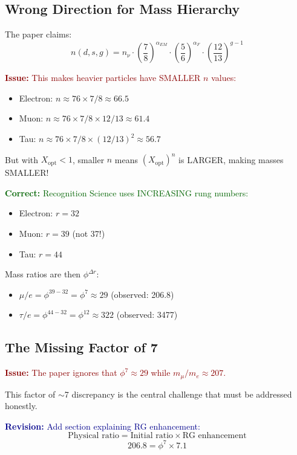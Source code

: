 \documentclass[12pt,a4paper]{article}
\newcommand{\issue}[1]{\textcolor{darkred}{\textbf{Issue: }#1}}
\newcommand{\correct}[1]{\textcolor{darkgreen}{\textbf{Correct: }#1}}
\newcommand{\revision}[1]{\textcolor{darkblue}{\textbf{Revision: }#1}}
\begin{document}
\subsection{Wrong Direction for Mass Hierarchy}

The paper claims:
\begin{equation}
n(d,s,g) = n_\nu \cdot \left(\frac{7}{8}\right)^{\alpha_{EM}} \cdot \left(\frac{5}{6}\right)^{\alpha_F} \cdot \left(\frac{12}{13}\right)^{g-1}
\end{equation}

\issue{This makes heavier particles have SMALLER $n$ values:}
\begin{itemize}
\item Electron: $n \approx 76 \times 7/8 \approx 66.5$
\item Muon: $n \approx 76 \times 7/8 \times 12/13 \approx 61.4$  
\item Tau: $n \approx 76 \times 7/8 \times (12/13)^2 \approx 56.7$
\end{itemize}

But with $X_{\text{opt}} < 1$, smaller $n$ means $(X_{\text{opt}})^n$ is LARGER, making masses SMALLER!

\correct{Recognition Science uses INCREASING rung numbers:}
\begin{itemize}
\item Electron: $r = 32$
\item Muon: $r = 39$ (not 37!)
\item Tau: $r = 44$
\end{itemize}

Mass ratios are then $\phi^{\Delta r}$:
\begin{itemize}
\item $\mu/e = \phi^{39-32} = \phi^7 \approx 29$ (observed: 206.8)
\item $\tau/e = \phi^{44-32} = \phi^{12} \approx 322$ (observed: 3477)
\end{itemize}

\subsection{The Missing Factor of 7}

\issue{The paper ignores that $\phi^7 \approx 29$ while $m_\mu/m_e \approx 207$.}

This factor of $\sim$7 discrepancy is the central challenge that must be addressed honestly.

\revision{Add section explaining RG enhancement:}
\begin{equation}
\text{Physical ratio} = \text{Initial ratio} \times \text{RG enhancement}
\end{equation}
\begin{equation}
206.8 = \phi^7 \times 7.1
\end{equation}
\end{document}
